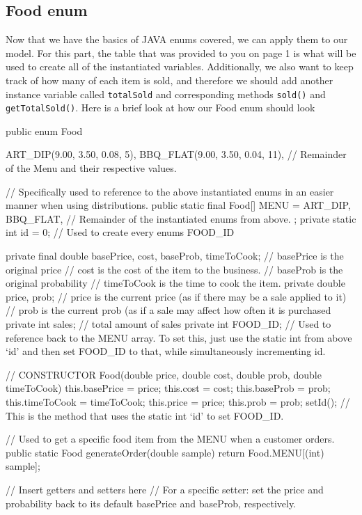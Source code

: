 \documentclass[11pt]{article}
\newcommand{\code}[1]{\texttt{#1}}
\newcommand{\method}[1]{\texttt{#1}}
\begin{document}
\subsection*{Food enum}
Now that we have the basics of JAVA enums covered, we can apply them to our model. For this part, the table that was provided to you on page 1 is what will be used to create all of the instantiated variables. Additionally, we also want to keep track of how many of each item is sold, and therefore we should add another instance variable called \code{totalSold} and corresponding methods \method{sold()} and \method{getTotalSold()}.
Here is a brief look at how our Food enum should look
\begin{java}
public enum Food
{
	ART_DIP(9.00, 3.50, 0.08, 5),
	BBQ_FLAT(9.00, 3.50, 0.04, 11),
	// Remainder of the Menu and their respective values.

	// Specifically used to reference to the above instantiated enums in an easier manner when using distributions.
	public static final Food[] MENU =
		{
			ART_DIP,
			BBQ_FLAT,
			// Remainder of the instantiated enums from above.
		};
	private static int id = 0; // Used to create every enums FOOD_ID

	private final double basePrice, cost, baseProb, timeToCook; // basePrice is the original price
										// cost is the cost of the item to the business.
										// baseProb is the original probability
										// timeToCook is the time to cook the item.
	private double price, prob; // price is the current price (as if there may be a sale applied to it)
					 // prob is the current prob (as if a sale may affect how often it is purchased
	private int sales;		 // total amount of sales
	private int FOOD_ID;	 // Used to reference back to the MENU array. To set this, just use the static int from above `id' and then set FOOD_ID to that, while simultaneously incrementing id.

	// CONSTRUCTOR
	Food(double price, double cost, double prob, double timeToCook)
	{
		this.basePrice = price;
		this.cost = cost;
		this.baseProb = prob;
		this.timeToCook = timeToCook;
		this.price = price;
		this.prob = prob;
		setId(); // This is the method that uses the static int `id' to set FOOD_ID.
	}

	// Used to get a specific food item from the MENU when a customer orders.
	public static Food generateOrder(double sample)
	{
		return Food.MENU[(int) sample];
	}

	// Insert getters and setters here
	// For a specific setter: set the price and probability back to its default basePrice and baseProb, respectively.
}
\end{java}
\pagebreak
\end{document}
